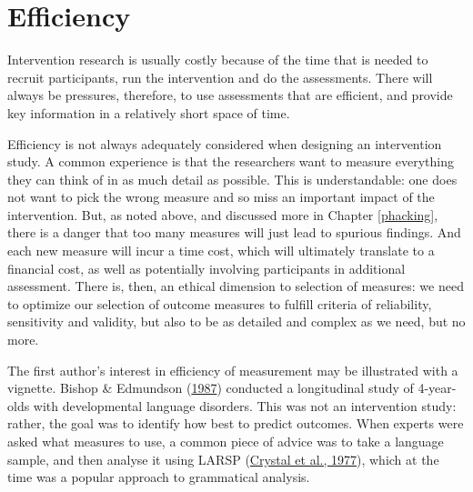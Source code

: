\documentclass{krantz}
\begin{document}
\hypertarget{efficiency}{%
\section{Efficiency}\label{efficiency}}

Intervention research is usually costly because of the time that is needed to recruit participants, run the intervention and do the assessments. There will always be pressures, therefore, to use assessments that are efficient, and provide key information in a relatively short space of time.

Efficiency is not always adequately considered when designing an intervention study. A common experience is that the researchers want to measure everything they can think of in as much detail as possible. This is understandable: one does not want to pick the wrong measure and so miss an important impact of the intervention. But, as noted above, and discussed more in Chapter \ref{phacking}, there is a danger that too many measures will just lead to spurious findings. And each new measure will incur a time cost, which will ultimately translate to a financial cost, as well as potentially involving participants in additional assessment. There is, then, an ethical dimension to selection of measures: we need to optimize our selection of outcome measures to fulfill criteria of reliability, sensitivity and validity, but also to be as detailed and complex as we need, but no more.

The first author's interest in efficiency of measurement may be illustrated with a vignette. Bishop \& Edmundson (\protect\hyperlink{ref-bishop1987}{1987}) conducted a longitudinal study of 4-year-olds with developmental language disorders. This was not an intervention study: rather, the goal was to identify how best to predict outcomes. When experts were asked what measures to use, a common piece of advice was to take a language sample, and then analyse it using LARSP (\protect\hyperlink{ref-crystal1977}{Crystal et al., 1977}), which at the time was a popular approach to grammatical analysis.
\end{document}

